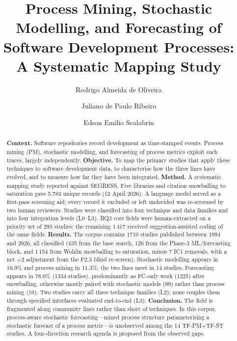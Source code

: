 \documentclass[preprint,12pt,authoryear=false]{elsarticle}
\newcommand{\PM}{TF-PM}
\newcommand{\ST}{TF-ST}
\begin{document}
\begin{frontmatter}

\title{Process Mining, Stochastic Modelling, and Forecasting of Software Development Processes: A Systematic Mapping Study}

\author[pucpr]{Rodrigo Almeida de Oliveira}
\author[pucpr]{Juliano de Paulo Ribeiro}
\author[pucpr]{Edson Emilio Scalabrin}

\begin{abstract}\small
\textbf{Context.} Software repositories record development as time-stamped events. Process mining (PM), stochastic modelling, and forecasting of process metrics exploit such traces, largely independently.
\textbf{Objective.} To map the primary studies that apply these techniques to software development data, to characterise how the three lines have evolved, and to measure how far they have been integrated.
\textbf{Method.} A systematic mapping study reported against SEGRESS. Five libraries and citation snowballing to saturation gave 5,783 unique records (12 April 2026). A language model served as a first-pass screening aid; every record it excluded or left undecided was re-screened by two human reviewers. Studies were classified into four technique and data families and into four integration levels (L0--L3). RQ3 core fields were human-extracted on a priority set of 293 studies; the remaining 1\,417 received suggestion-assisted coding of the same fields.
\textbf{Results.} The corpus contains 1710 studies published between 1994 and 2026, all classified (435 from the base search, 126 from the Phase-3 ML/forecasting block, and 1\,154 from Wohlin snowballing to saturation, minus 7 IC1 removals, with a net $+2$ adjustment from the F2.3 blind re-screen). Stochastic modelling appears in 16.9\% and process mining in 11.3\%; the two lines meet in 14 studies. Forecasting appears in 78.0\% (1334 studies), predominantly as FC-only work (1225) after snowballing, otherwise mostly paired with stochastic models (99) rather than process mining (10). Two studies carry all three technique families (L2); none couples them through specified interfaces evaluated end-to-end (L3).
\textbf{Conclusion.} The field is fragmented along community lines rather than short of techniques. In this corpus, process-aware stochastic forecasting---mined process structure parameterising a stochastic forecast of a process metric---is unobserved among the 14 \PM{}+\ST{} studies. A four-direction research agenda is proposed from the observed gaps.
\end{abstract}


\end{frontmatter}
\end{document}
